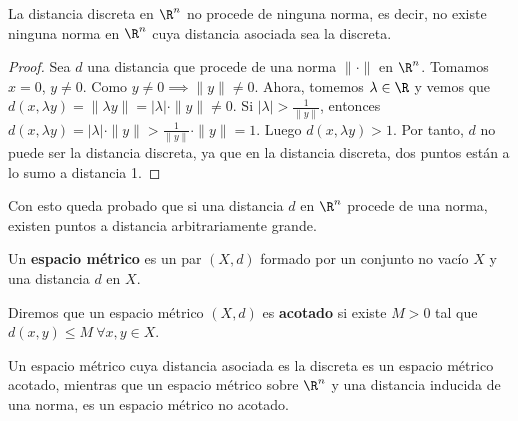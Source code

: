 \begin{properties}
  La distancia discreta en $\R^n$ no procede de ninguna norma, es decir, no existe ninguna norma en $\R^n$ cuya distancia asociada sea la discreta.
\end{properties}
\begin{proof}
  Sea $d$ una distancia que procede de una norma $\|\cdot\|$ en $\R^n$. Tomamos $x=0$, $y\neq0$. Como $y \neq 0 \implies \|y\| \neq 0$. Ahora, tomemos $\lambda\in\R$ y vemos que $d(x,\lambda y) = \|\lambda y\| = |\lambda|\cdot\|y\|\neq 0$.
  Si $|\lambda| > \frac{1}{\|y\|}$, entonces $d(x,\lambda y) = |\lambda| \cdot \|y\| > \frac{1}{\|y\|} \cdot \|y\|=1$. Luego $d(x,\lambda y) > 1$. Por tanto, $d$ no puede ser la distancia discreta, ya que en la distancia discreta, dos puntos están a lo sumo a distancia 1.
\end{proof}
Con esto queda probado que si una distancia $d$ en $\R^n$ procede de una norma, existen puntos a distancia arbitrariamente grande.

\begin{ndef}
  Un \textbf{espacio métrico} es un par $(X,d)$ formado por un conjunto no vacío $X$ y una distancia $d$ en $X$.
\end{ndef}
\begin{ndef}
  Diremos que un espacio métrico $(X,d)$ es \textbf{acotado} si existe $M>0$ tal que $d(x,y)\leq M \ \forall x,y \in X$.
\end{ndef}
\begin{exmp}
  Un espacio métrico cuya distancia asociada es la discreta es un espacio métrico acotado, mientras que un espacio métrico sobre $\R^n$ y una distancia inducida de una norma, es un espacio métrico no acotado.
\end{exmp}

